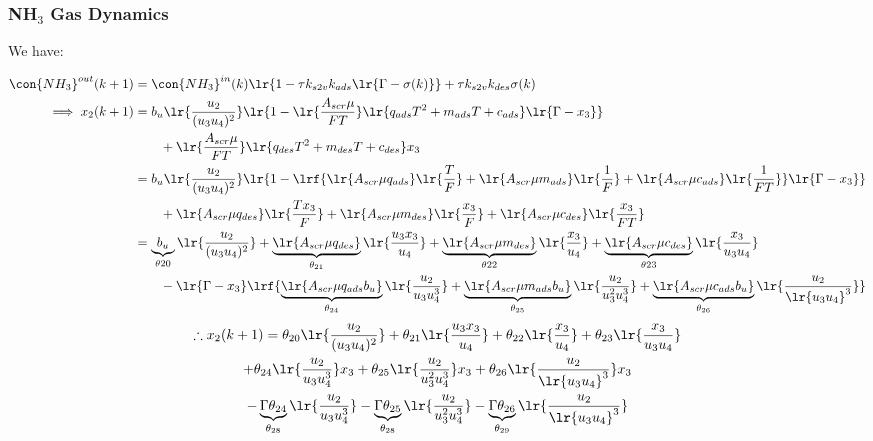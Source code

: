 \subsubsection{NH$_3$ Gas Dynamics}
We have:

\begin{align*}
    \con{NH_3}^{out} (k + 1) &= \con{NH_3}^{in}(k) \lr{1 - \tau k_{s2v}k_{ads} \lr{\Gamma - \sigma(k)}} + \tau k_{s2v} k_{des} \sigma(k)\\
    \implies x_2(k+1) &= b_u \lr{\frac{u_2}{(u_3u_4)^2}} \lr{ 1 - \lr{\frac{A_{scr} \mu}{FT}}  \lr{q_{ads}T^2 + m_{ads} T + c_{ads}} \lr{\Gamma - x_3}}\\
                                 &\qquad + \lr{\frac{A_{scr} \mu}{FT}} \lr{q_{des} T^2 + m_{des} T + c_{des}} x_3\\
    &= b_u \lr{\frac{u_2}{(u_3u_4)^2}}
                    \lr{ 1 - \lrf{\lr{A_{scr} \mu q_{ads}} \lr{\frac{T}{F}} + \lr{A_{scr} \mu m_{ads}} \lr{\frac{1}{F}} + \lr{A_{scr} \mu c_{ads}}  \lr{\frac{1}{FT}}}
                    \lr{\Gamma - x_3}}\\
                                 &\qquad + \lr{A_{scr} \mu q_{des}} \lr{\frac{T x_3}{F}} + \lr{A_{scr} \mu m_{des}} \lr{\frac{x_3}{F}} + \lr{A_{scr} \mu c_{des}} \lr{\frac{x_3}{FT}}\\
    &= \underbrace{b_u}_{\theta{20}} \lr{\frac{u_2}{(u_3u_4)^2}}
    + \underbrace{\lr{A_{scr} \mu q_{des}}}_{\theta_{21}}  \lr{\frac{u_3 x_3}{u_4}}
    + \underbrace{\lr{A_{scr} \mu m_{des}}}_{\theta{22}}   \lr{\frac{x_3}{u_4}}
    + \underbrace{\lr{A_{scr} \mu c_{des}}}_{\theta{23}}  \lr{\frac{x_3}{u_3 u_4}}\\
    &\qquad - \lr{\Gamma - x_3}  \lrf{\underbrace{\lr{A_{scr} \mu q_{ads}b_u}}_{\theta_{24}} \lr{\frac{u_2}{u_3 u_4^3}}
                                                         + \underbrace{\lr{A_{scr} \mu m_{ads}b_u}}_{\theta_{25}} \lr{\frac{u_2}{u_3^2 u_4^3}}
                                                         + \underbrace{\lr{A_{scr} \mu c_{ads} b_u}}_{\theta_{26}}  \lr{\frac{u_2}{\lr{u_3 u_4}^3}}}
\end{align*}
\begin{multline}
    \therefore x_2(k+1)
    = \theta_{20} \lr{\frac{u_2}{(u_3u_4)^2}}
    + \theta_{21}  \lr{\frac{u_3 x_3}{u_4}}
    + \theta_{22}   \lr{\frac{x_3}{u_4}}
    + \theta_{23}  \lr{\frac{x_3}{u_3 u_4}}\\
    + \theta_{24} \lr{\frac{u_2}{u_3 u_4^3}} x_3
    + \theta_{25} \lr{\frac{u_2}{u_3^2 u_4^3}} x_3
    + \theta_{26}  \lr{\frac{u_2}{\lr{u_3 u_4}^3}} x_3\\
    - \underbrace{\Gamma \theta_{24}}_{\theta_{28}} \lr{\frac{u_2}{u_3 u_4^3}}
    - \underbrace{\Gamma \theta_{25}}_{\theta_{28}} \lr{\frac{u_2}{u_3^2 u_4^3}}
    - \underbrace{\Gamma \theta_{26}}_{\theta_{29}}  \lr{\frac{u_2}{\lr{u_3 u_4}^3}}
\end{multline}
